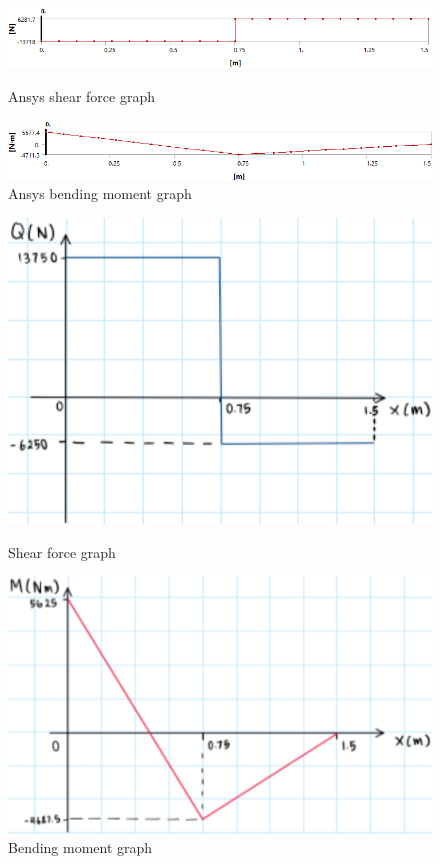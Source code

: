 \documentclass[11pt]{article}
\numberwithin{equation}{section}
\begin{document}
\begin{figure}[H]
  \centering
  \begin{minipage}[b]{0.49\textwidth}
    \includegraphics[width=\textwidth]{./img/Q2ShearAnsys.png}
    \caption{Ansys shear force graph}
  \end{minipage}
  \hfill
  \begin{minipage}[b]{0.49\textwidth}
    \includegraphics[width=\textwidth]{./img/Q2BendingAnsys.png}
    \caption{Ansys bending moment graph}
  \end{minipage}
\end{figure}
\begin{figure}[H]
  \centering
  \begin{minipage}[b]{0.49\textwidth}
    \includegraphics[width=\textwidth]{./img/Q2Shear.png}
    \caption{Shear force graph}
  \end{minipage}
  \hfill
  \begin{minipage}[b]{0.49\textwidth}
    \includegraphics[width=\textwidth]{./img/Q2Bending.png}
    \caption{Bending moment graph}
  \end{minipage}
\end{figure}
\end{document}
